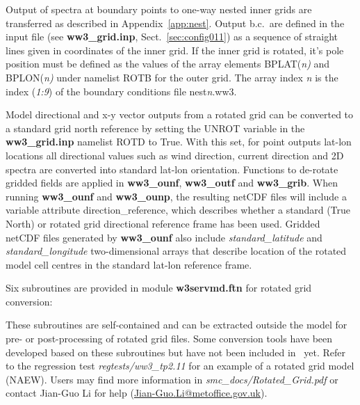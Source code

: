 Output of spectra at boundary points to one-way nested inner grids are transferred
as described in Appendix~\ref{app:nest}. Output b.c.\ are defined in the input
file (see {\bf ww3\_grid.inp}, Sect.~\ref{sec:config011}) as a sequence of straight
lines given in coordinates of the inner grid. If the inner grid is rotated, it's
pole position must be defined as the values of the array elements
{\code BPLAT(\sl{n})} and {\code BPLON(\sl{n})} under namelist {\code ROTB}
for the outer grid. The array index {\sl{n}} is the index ({\sl{1:9}}) of the boundary
conditions file {\file nest{\sl{n}}.ww3}.

Model directional and x-y vector outputs from a rotated grid can be converted
to a standard grid north reference by setting the UNROT variable in the
{\bf ww3\_grid.inp} namelist ROTD to True. With this set, for point outputs
lat-lon locations all directional
values such as wind direction, current direction and 2D spectra are converted
into standard lat-lon orientation. Functions to de-rotate gridded
fields are applied in {\bf ww3\_ounf}, {\bf ww3\_outf} and {\bf ww3\_grib}. 
When running {\bf ww3\_ounf} and {\bf ww3\_ounp}, the resulting netCDF
files will include a variable attribute direction\_reference, which describes
whether a standard (True North) or rotated grid directional reference frame
has been used. Gridded netCDF files generated by {\bf ww3\_ounf} also include
\emph{standard\_latitude} and \emph{standard\_longitude} two-dimensional arrays
that describe location of the rotated model cell centres in the standard lat-lon
reference frame. 

Six subroutines are provided in module {\bf w3servmd.ftn} for rotated grid
conversion:
\begin{vlist}
\end{vlist}
These subroutines are self-contained and can be extracted outside the model
for pre- or post-processing of rotated grid files.  Some conversion tools have
been developed based on these subroutines but have not been included in \ws\
yet. Refer to the regression test \emph{regtests/ww3\_tp2.11} for an example
of a rotated grid model (NAEW).  Users may find more information in
\emph{smc\_docs/Rotated\_Grid.pdf} or contact Jian-Guo Li for help
(\url{Jian-Guo.Li@metoffice.gov.uk}).
